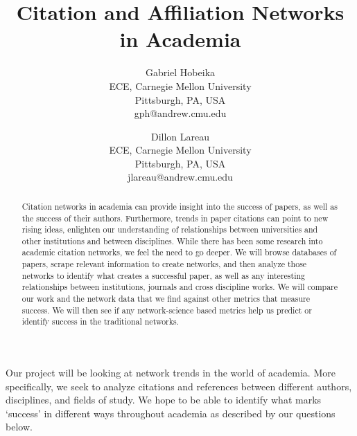 \documentclass[times, 10pt,twocolumn]{article}
\begin{document}
\title{Citation and Affiliation Networks in Academia }

\author{Gabriel Hobeika\\
ECE, Carnegie Mellon University\\ Pittsburgh, PA, USA\\
gph@andrew.cmu.edu\\
\and
Dillon Lareau\\
ECE, Carnegie Mellon University\\ Pittsburgh, PA, USA\\
jlareau@andrew.cmu.edu\\
}

\maketitle
\thispagestyle{empty}

\begin{abstract}
Citation networks in academia can provide insight into the success of papers, as well as the success of their authors. Furthermore, trends in paper citations can point to new rising ideas, enlighten our understanding of relationships between universities and other institutions and between disciplines. While there has been some research into academic citation networks, we feel the need to go deeper. We will browse databases of papers, scrape relevant information to create networks, and then analyze those networks to identify what creates a successful paper, as well as any interesting relationships between institutions, journals and cross discipline works. We will compare our work and the network data that we find against other metrics that measure success. We will then see if any network-science based metrics help us predict or identify success in the traditional networks.
\end{abstract}


Our project will be looking at network trends in the world of academia. More specifically, we seek to analyze citations and references between different authors, disciplines, and fields of study. We hope to be able to identify what marks ‘success’ in different ways throughout academia as described by our questions below.
\end{document}
